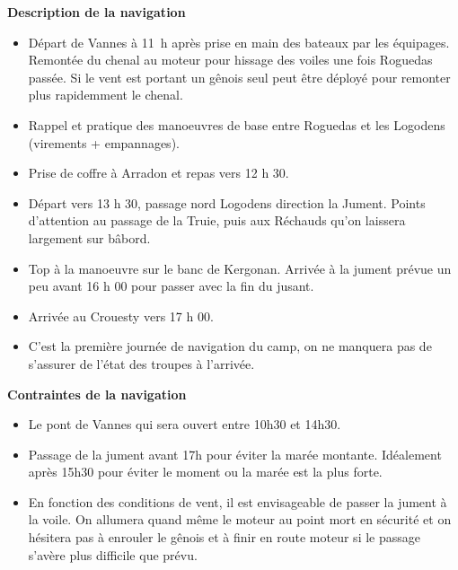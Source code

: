 \begin{minipage}[c][\textheight][t]{0.10\textwidth}
\hfill
\end{minipage}%
\begin{minipage}[c][\textheight][t]{0.50\textwidth}
    \vspace{4cm}
    \color{StrongBlue}    
    {\huge \textbf{Description de la navigation}}\\
            \begin{itemize}
                \item Départ de Vannes à 11 h après prise en main des bateaux par les équipages. Remontée du chenal au moteur pour hissage des voiles une fois Roguedas passée. Si le vent est portant un gênois seul peut être déployé pour remonter plus rapidemment le chenal. 
                \item Rappel et pratique des manoeuvres de base entre Roguedas et les Logodens (virements + empannages).
                \item Prise de coffre à Arradon et repas vers 12 h 30. 
                \item Départ vers 13 h 30, passage nord Logodens direction la Jument. Points d'attention au passage de la Truie, puis aux Réchauds qu'on laissera largement sur bâbord. 
                \item Top à la manoeuvre sur le banc de Kergonan. Arrivée à la jument prévue un peu avant 16 h 00 pour passer avec la fin du jusant.
                \item Arrivée au Crouesty vers 17 h 00.
                \item C'est la première journée de navigation du camp, on ne manquera pas de s'assurer de l'état des troupes à l'arrivée. 
            \end{itemize}
        {
        \huge \textbf{Contraintes de la navigation}}\\
            \begin{itemize}
                \item Le pont de Vannes qui sera ouvert entre 10h30 et 14h30. 
                \item Passage de la jument avant 17h pour éviter la marée montante. Idéalement après 15h30 pour éviter le moment ou la marée est la plus forte.  
                \item En fonction des conditions de vent, il est envisageable de passer la jument à la voile. On allumera quand même le moteur au point mort en sécurité et on hésitera pas à enrouler le gênois et à finir en route moteur si le passage s'avère plus difficile que prévu. 
            \end{itemize}
\end{minipage}%
